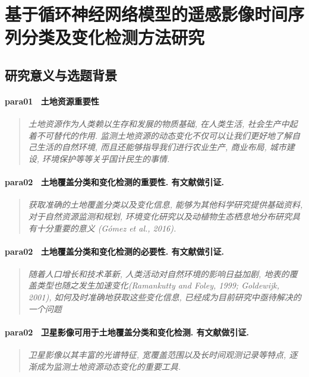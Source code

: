 \section{基于循环神经网络模型的遥感影像时间序列分类及变化检测方法研究}

\subsection{研究意义与选题背景}

\paragraph*{para01~
    \textcolor[RGB]{17, 205, 29}{土地资源重要性}}
\begin{quotation}
    \itshape
    土地资源作为人类赖以生存和发展的物质基础, 在人类生活, 社会生产中起着不可替代的作用. 监测土地资源的动态变化不仅可以让我们更好地了解自己生活的自然环境, 而且还能够指导我们进行农业生产, 商业布局, 城市建设, 环境保护等等关乎国计民生的事情. 
\end{quotation}

\paragraph*{para02~
    \textcolor[RGB]{17, 205, 29}{土地覆盖分类和变化检测的重要性. 有文献做引证.}}
\begin{quotation}
    \itshape
    获取准确的土地覆盖分类以及变化信息, 能够为其他科学研究提供基础资料, 对于自然资源监测和规划, 环境变化研究以及动植物生态栖息地分布研究具有十分重要的意义 (Gómez et al., 2016).
\end{quotation}

\paragraph*{para02~
    \textcolor[RGB]{17, 205, 29}{土地覆盖分类和变化检测的必要性. 有文献做引证.}}
\begin{quotation}
    \itshape
    随着人口增长和技术革新, 人类活动对自然环境的影响日益加剧, 地表的覆盖类型也随之发生加速变化(Ramankutty and Foley, 1999; Goldewijk, 2001), 如何及时准确地获取这些变化信息, 已经成为目前研究中亟待解决的一个问题
\end{quotation}

\paragraph*{para02~
    \textcolor[RGB]{17, 205, 29}{卫星影像可用于土地覆盖分类和变化检测. 有文献做引证.}}
\begin{quotation}
    \itshape
    卫星影像以其丰富的光谱特征, 宽覆盖范围以及长时间观测记录等特点, 逐渐成为监测土地资源动态变化的重要工具.
\end{quotation}

